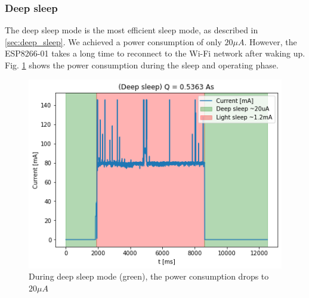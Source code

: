 \subsubsection{Deep sleep}
The deep sleep mode is the most efficient sleep mode, as described in \ref{sec:deep_sleep}. 
We achieved a power consumption of only $20 \mu A$. 
However, the ESP8266-01 takes a long time to reconnect to the Wi-Fi network after waking up.
Fig. \ref{fig:deep_sleep} shows the power consumption during the sleep and operating phase.
\begin{figure}[H]
    \includegraphics[width = \linewidth]{fig/deep_sleep.png}
    \caption{During deep sleep mode (green), the power consumption drops to $20 \mu A$}
    \label{fig:deep_sleep}
\end{figure}